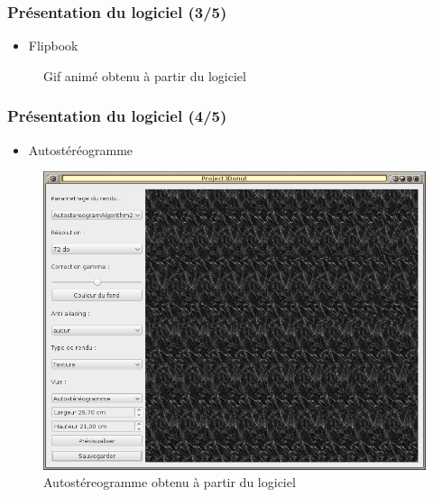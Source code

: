 \documentclass{beamer}
\begin{document}
%
\begin{frame}
\frametitle{Présentation du logiciel (3/5)}
\begin{itemize}[label=$\bullet$]
\item Flipbook 
\end{itemize}
\begin{figure}
\centering
{}
\caption{Gif animé obtenu à partir du logiciel}
\end{figure}
\end{frame}



%
\begin{frame}
\frametitle{Présentation du logiciel (4/5)}
\begin{itemize}[label=$\bullet$]
\item Autostéréogramme
\end{itemize}
\begin{figure}
\centering
\includegraphics[scale=0.28]{renduautostereogrammes.png}
\caption{Autostéreogramme obtenu à partir du logiciel}
\end{figure}
\end{frame}
\end{document}
